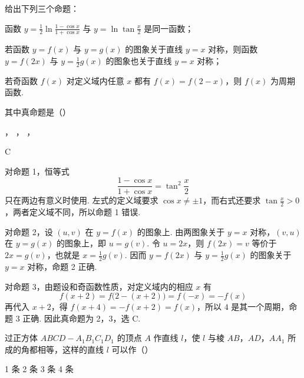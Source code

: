 \begin{problem}
给出下列三个命题：

\begin{circlelist}
\item 函数 \(y = \frac{1}{2}\ln\frac{1 - \cos x}{1 + \cos x}\) 与 \(y = \ln \tan\frac{x}{2}\) 是同一函数；

\item 若函数 \(y = f(x)\) 与 \(y = g(x)\) 的图象关于直线 \(y = x\) 对称，则函数 \(y = f(2x)\) 与 \(y = \frac{1}{2}g(x)\) 的图象也关于直线 \(y = x\) 对称；

\item 若奇函数 \(f(x)\) 对定义域内任意 \(x\) 都有 \(f(x) = f(2 - x)\)，则 \(f(x)\) 为周期函数.
\end{circlelist}

其中真命题是（\quad）

\choices
    {，}
    {，}
    {，}
    {}
\end{problem}

\begin{answer}
C
\end{answer}

\begin{solution}
对命题 1，恒等式
\[
\frac{1-\cos x}{1+\cos x}=\tan^2\frac{x}{2}
\]
只在两边有意义时使用. 左式的定义域要求 \(\cos x\neq\pm1\)，而右式还要求 \(\tan\frac{x}{2}>0\)，两者定义域不同，所以命题 1 错误.

对命题 2，设 \((u,v)\) 在 \(y=f(x)\) 的图象上. 由两图象关于 \(y=x\) 对称，\((v,u)\) 在 \(y=g(x)\) 的图象上，即 \(u=g(v)\). 令 \(u=2x\)，则 \(f(2x)=v\) 等价于 \(2x=g(v)\)，也就是 \(x=\frac12g(v)\). 因而 \(y=f(2x)\) 与 \(y=\frac12g(x)\) 的图象关于 \(y=x\) 对称，命题 2 正确.

对命题 3，由题设和奇函数性质，对定义域内的相应 \(x\) 有
\[
f(x+2)=f\bigl(2-(x+2)\bigr)=f(-x)=-f(x)
\]
再代入 \(x+2\)，得 \(f(x+4)=-f(x+2)=f(x)\)，所以 \(4\) 是其一个周期，命题 3 正确. 因此真命题为 2，3，选 C.
\end{solution}

\begin{problem}
过正方体 \(ABCD - A_1B_1C_1D_1\) 的顶点 \(A\) 作直线 \(l\)，使 \(l\) 与棱 \(AB\)，\(AD\)，\(AA_1\) 所成的角都相等，这样的直线 \(l\) 可以作（\quad）


\choices
    {1 条}
    {2 条}
    {3 条}
    {4 条}
\end{problem}

